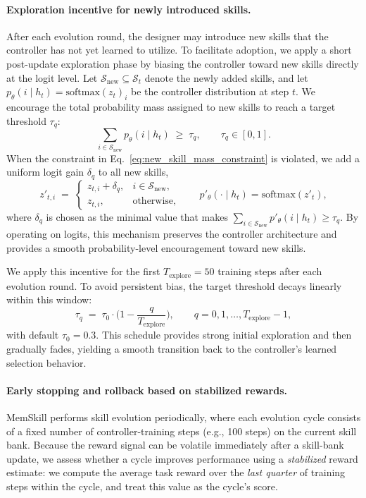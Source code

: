 \paragraph{Exploration incentive for newly introduced skills.}
After each evolution round, the designer may introduce new skills that the controller has not yet learned to utilize.
To facilitate adoption, we apply a short post-update exploration phase by biasing the controller toward new skills directly at the logit level.
Let $\mathcal{S}_{\text{new}} \subseteq \mathcal{S}_t$ denote the newly added skills, and let $p_\theta(i\mid h_t)=\mathrm{softmax}(z_t)_i$ be the controller distribution at step $t$.
We encourage the total probability mass assigned to new skills to reach a target threshold $\tau_q$:
\begin{equation}
\sum_{i\in \mathcal{S}_{\text{new}}} p_\theta(i\mid h_t)\;\ge\;\tau_q,
\qquad \tau_q\in[0,1].
\label{eq:new_skill_mass_constraint}
\end{equation}
When the constraint in Eq.~\eqref{eq:new_skill_mass_constraint} is violated, we add a uniform logit gain $\delta_q$ to all new skills,
\begin{equation}
z'_{t,i} \;=\;
\begin{cases}
z_{t,i} + \delta_q, & i\in \mathcal{S}_{\text{new}},\\
z_{t,i}, & \text{otherwise},
\end{cases}
\qquad
p'_\theta(\cdot\mid h_t)=\mathrm{softmax}(z'_t),
\end{equation}
where $\delta_q$ is chosen as the minimal value that makes $\sum_{i\in \mathcal{S}_{\text{new}}} p'_\theta(i\mid h_t)\ge\tau_q$.
By operating on logits, this mechanism preserves the controller architecture and provides a smooth probability-level encouragement toward new skills.

We apply this incentive for the first $T_{\text{explore}}{=}50$ training steps after each evolution round.
To avoid persistent bias, the target threshold decays linearly within this window:
\begin{equation}
\tau_q \;=\; \tau_0 \cdot \Big(1 - \frac{q}{T_{\text{explore}}}\Big),
\qquad q=0,1,\dots,T_{\text{explore}}-1,
\end{equation}
with default $\tau_0{=}0.3$.
This schedule provides strong initial exploration and then gradually fades, yielding a smooth transition back to the controller's learned selection behavior.



\paragraph{Early stopping and rollback based on stabilized rewards.}
MemSkill performs skill evolution periodically, where each evolution cycle consists of a fixed number of controller-training steps (e.g., 100 steps) on the current skill bank. Because the reward signal can be volatile immediately after a skill-bank update, we assess whether a cycle improves performance using a \emph{stabilized} reward estimate: we compute the average task reward over the \emph{last quarter} of training steps within the cycle, and treat this value as the cycle's score.

